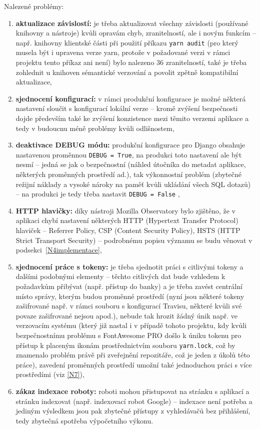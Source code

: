 Nalezené problémy:
\begin{enumerate}[label=\textbf{B\arabic*}]
    \item \label{B1} \textbf{aktualizace závislostí:} je třeba aktualizovat všechny závislosti (používané knihovny a nástroje) kvůli opravám chyb, zranitelností, ale i novým funkcím -- např. knihovny klientské části při použití příkazu \verb|yarn audit| (pro který musela být i upravena verze yarn, protože v požadované verzi v rámci projektu tento příkaz ani není) bylo nalezeno 36 zranitelností, také je třeba zohlednit u knihoven sémantické verzování a povolit zpětně kompatibilní aktualizace,
    \item \label{B2} \textbf{sjednocení konfigurací:} v rámci produkční konfigurace je možné některá nastavení sloučit s konfigurací lokální verze -- kromě zvýšení bezpečnosti dojde především také ke zvýšení konzistence mezi těmito verzemi aplikace a tedy v budoucnu méně problémy kvůli odlišnostem,
    \item \label{B3} \textbf{deaktivace DEBUG módu:} produkční konfigurace pro 
    Django obsahuje nastavenou proměnnou \verb|DEBUG = True|, na produkci toto nastavení ale být nesmí -- jedná se jak o bezpečnostní (náhled útočníka do metadat aplikace, některých proměnných prostředí ad.), tak výkonnostní problém (zbytečné režijní náklady a vysoké nároky na paměť kvůli ukládání všech SQL dotazů) -- na produkci je tedy třeba nastavit \verb|DEBUG = False| \cite{django-debug},
    \item \label{B4} \textbf{HTTP hlavičky:} díky nástroji Mozilla Observatory bylo zjištěno, že v aplikaci chybí nastavení některých HTTP (Hypertext Transfer Protocol) hlaviček -- Referrer Policy, CSP (Content Security Policy), HSTS (HTTP Strict Transport Security) -- podrobnému popisu významu se budu věnovat v podsekci~\ref{N4implementace},
    \item \label{B5} \textbf{sjednocení práce s tokeny:} je třeba sjednotit práci s citlivými tokeny a dalšími podobnými elementy -- těchto citlivých dat bude vzhledem k požadavkům přibývat (např. přístup do banky) a je třeba zavést centrální místo správy, kterým budou proměnné prostředí (nyní jsou některé tokeny zašifrované např. v rámci souboru s konfigurací Travisu, některé kvůli své povaze zašifrované nejsou apod.), nebude tak hrozit žádný únik např. ve verzovacím systému (který již nastal i v případě tohoto projektu, kdy kvůli bezpečnostnímu problému s FontAwesome PRO \cite{fontawesome-token} došlo k úniku tokenu pro přístup k placeným ikonám prostřednictvím souboru \verb|yarn.lock|, což by znamenalo problém právě při zveřejnění repozitáře, což je jeden z úkolů této práce), zavedení proměnných prostředí umožní také jednoduchou práci s více prostředími (viz \ref{N7}),
    \item \label{B6} \textbf{zákaz indexace roboty:} roboti mohou přistupovat na stránku s aplikací a stránku indexovat (např. indexovací robot Google) -- indexace není potřeba a jediným výsledkem jsou pak zbytečné přístupy z vyhledávačů bez přihlášení, tedy zbytečná spotřeba výpočetního výkonu.
\end{enumerate}


